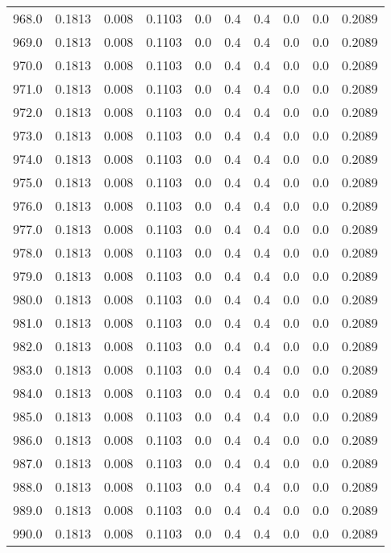 \begin{longtable}{lrrrrrrrrr}
968.0 & 0.1813 & 0.008 & 0.1103 & 0.0 & 0.4 & 0.4 & 0.0 & 0.0 & 0.2089 \\
969.0 & 0.1813 & 0.008 & 0.1103 & 0.0 & 0.4 & 0.4 & 0.0 & 0.0 & 0.2089 \\
970.0 & 0.1813 & 0.008 & 0.1103 & 0.0 & 0.4 & 0.4 & 0.0 & 0.0 & 0.2089 \\
971.0 & 0.1813 & 0.008 & 0.1103 & 0.0 & 0.4 & 0.4 & 0.0 & 0.0 & 0.2089 \\
972.0 & 0.1813 & 0.008 & 0.1103 & 0.0 & 0.4 & 0.4 & 0.0 & 0.0 & 0.2089 \\
973.0 & 0.1813 & 0.008 & 0.1103 & 0.0 & 0.4 & 0.4 & 0.0 & 0.0 & 0.2089 \\
974.0 & 0.1813 & 0.008 & 0.1103 & 0.0 & 0.4 & 0.4 & 0.0 & 0.0 & 0.2089 \\
975.0 & 0.1813 & 0.008 & 0.1103 & 0.0 & 0.4 & 0.4 & 0.0 & 0.0 & 0.2089 \\
976.0 & 0.1813 & 0.008 & 0.1103 & 0.0 & 0.4 & 0.4 & 0.0 & 0.0 & 0.2089 \\
977.0 & 0.1813 & 0.008 & 0.1103 & 0.0 & 0.4 & 0.4 & 0.0 & 0.0 & 0.2089 \\
978.0 & 0.1813 & 0.008 & 0.1103 & 0.0 & 0.4 & 0.4 & 0.0 & 0.0 & 0.2089 \\
979.0 & 0.1813 & 0.008 & 0.1103 & 0.0 & 0.4 & 0.4 & 0.0 & 0.0 & 0.2089 \\
980.0 & 0.1813 & 0.008 & 0.1103 & 0.0 & 0.4 & 0.4 & 0.0 & 0.0 & 0.2089 \\
981.0 & 0.1813 & 0.008 & 0.1103 & 0.0 & 0.4 & 0.4 & 0.0 & 0.0 & 0.2089 \\
982.0 & 0.1813 & 0.008 & 0.1103 & 0.0 & 0.4 & 0.4 & 0.0 & 0.0 & 0.2089 \\
983.0 & 0.1813 & 0.008 & 0.1103 & 0.0 & 0.4 & 0.4 & 0.0 & 0.0 & 0.2089 \\
984.0 & 0.1813 & 0.008 & 0.1103 & 0.0 & 0.4 & 0.4 & 0.0 & 0.0 & 0.2089 \\
985.0 & 0.1813 & 0.008 & 0.1103 & 0.0 & 0.4 & 0.4 & 0.0 & 0.0 & 0.2089 \\
986.0 & 0.1813 & 0.008 & 0.1103 & 0.0 & 0.4 & 0.4 & 0.0 & 0.0 & 0.2089 \\
987.0 & 0.1813 & 0.008 & 0.1103 & 0.0 & 0.4 & 0.4 & 0.0 & 0.0 & 0.2089 \\
988.0 & 0.1813 & 0.008 & 0.1103 & 0.0 & 0.4 & 0.4 & 0.0 & 0.0 & 0.2089 \\
989.0 & 0.1813 & 0.008 & 0.1103 & 0.0 & 0.4 & 0.4 & 0.0 & 0.0 & 0.2089 \\
990.0 & 0.1813 & 0.008 & 0.1103 & 0.0 & 0.4 & 0.4 & 0.0 & 0.0 & 0.2089 \\

\end{longtable}
